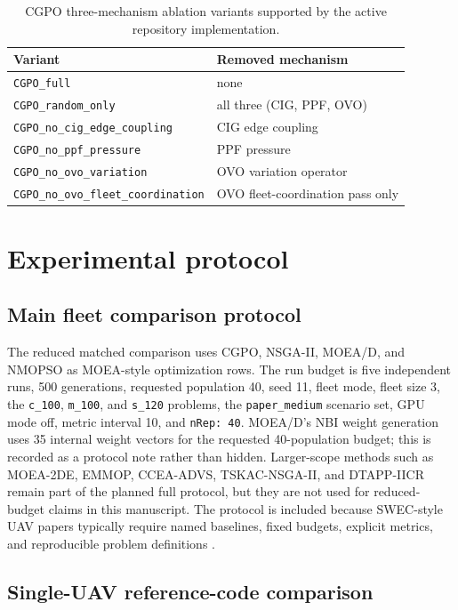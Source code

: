 \documentclass[a4paper,fleqn]{cas-dc}
\begin{document}
\begin{table}[t]
\centering
\small
\caption{CGPO three-mechanism ablation variants supported by the active repository implementation.}
\label{tab:ablation-variants}
\begin{tabular}{ll}
\toprule
Variant & Removed mechanism \\
\midrule
\texttt{CGPO\_full} & none \\
\texttt{CGPO\_random\_only} & all three (CIG, PPF, OVO) \\
\texttt{CGPO\_no\_cig\_edge\_coupling} & CIG edge coupling \\
\texttt{CGPO\_no\_ppf\_pressure} & PPF pressure \\
\texttt{CGPO\_no\_ovo\_variation} & OVO variation operator \\
\texttt{CGPO\_no\_ovo\_fleet\_coordination} & OVO fleet-coordination pass only \\
\bottomrule
\end{tabular}
\end{table}

\section{Experimental protocol}
\label{sec:experimental-protocol}

\subsection{Main fleet comparison protocol}

The reduced matched comparison uses CGPO, NSGA-II, MOEA/D, and NMOPSO as MOEA-style optimization rows. The run budget is five independent runs, 500 generations, requested population 40, seed 11, fleet mode, fleet size 3, the \texttt{c\_100}, \texttt{m\_100}, and \texttt{s\_120} problems, the \texttt{paper\_medium} scenario set, GPU mode off, metric interval 10, and \texttt{nRep: 40}. MOEA/D's NBI weight generation uses 35 internal weight vectors for the requested 40-population budget; this is recorded as a protocol note rather than hidden. Larger-scope methods such as MOEA-2DE, EMMOP, CCEA-ADVS, TSKAC-NSGA-II, and DTAPP-IICR remain part of the planned full protocol, but they are not used for reduced-budget claims in this manuscript. The protocol is included because SWEC-style UAV papers typically require named baselines, fixed budgets, explicit metrics, and reproducible problem definitions \cite{darlan2025benchmark,meng2025emmop}.

\subsection{Single-UAV reference-code comparison}
\end{document}
